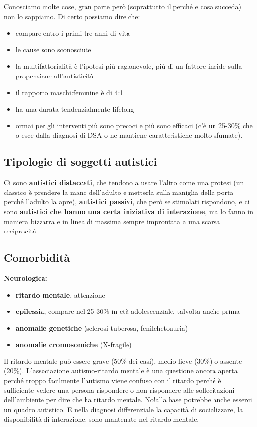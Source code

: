 Conosciamo molte cose, gran parte però (soprattutto il perché e cosa
succeda) non lo sappiamo. Di certo possiamo dire che:

\begin{itemize}
\item
  compare entro i primi tre anni di vita
\item
  le cause sono sconosciute
\item
  la multifattorialità è l'ipotesi più ragionevole, più di un fattore
  incide sulla propensione all'autisticità
\item
  il rapporto maschi:femmine è di 4:1
\item
  ha una durata tendenzialmente lifelong
\item
  ormai per gli interventi più sono precoci e più sono efficaci (c'è un
  25-30\% che o esce dalla diagnosi di DSA o ne mantiene caratteristiche
  molto sfumate).
\end{itemize}

\subsection{Tipologie di soggetti autistici}

Ci sono \textbf{autistici distaccati}, che tendono a usare l'altro come
una protesi (un classico è prendere la mano dell'adulto e metterla sulla
maniglia della porta perché l'adulto la apre), \textbf{autistici
passivi}, che però se stimolati rispondono, e ci sono \textbf{autistici
che hanno una certa iniziativa di interazione}, ma lo fanno in maniera
bizzarra e in linea di massima sempre improntata a una scarsa
reciprocità.

\subsection{Comorbidità}

\textbf{Neurologica:}

\begin{itemize}
\item
  \textbf{ritardo mentale}, attenzione
\item
  \textbf{epilessia}, compare nel 25-30\% in età adolescenziale,
  talvolta anche prima
\item
  \textbf{anomalie genetiche} (sclerosi tuberosa, fenilchetonuria)
\item
  \textbf{anomalie cromosomiche} (X-fragile)
\end{itemize}

Il ritardo mentale può essere grave (50\% dei casi), medio-lieve (30\%)
o assente (20\%). L'associazione autismo-ritardo mentale è una questione
ancora aperta perché troppo facilmente l'autismo viene confuso con il
ritardo perché è sufficiente vedere una persona rispondere o non
rispondere alle sollecitazioni dell'ambiente per dire che ha ritardo
mentale. No!alla base potrebbe anche esserci un quadro autistico. E
nella diagnosi differenziale la capacità di socializzare, la
disponibilità di interazione, sono mantenute nel ritardo mentale.

